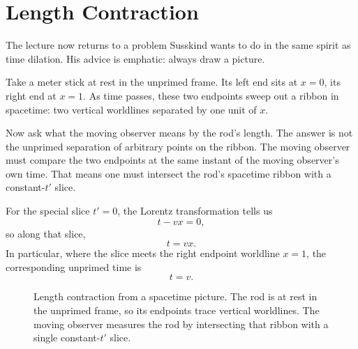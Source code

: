\section{Length Contraction}

The lecture now returns to a problem Susskind wants to do in the same spirit as time dilation. His advice is emphatic: always draw a picture.

Take a meter stick at rest in the unprimed frame. Its left end sits at \(x=0\), its right end at \(x=1\). As time passes, these two endpoints sweep out a ribbon in spacetime: two vertical worldlines separated by one unit of \(x\).

Now ask what the moving observer means by the rod's length. The answer is not the unprimed separation of arbitrary points on the ribbon. The moving observer must compare the two endpoints at the same instant of the moving observer's own time. That means one must intersect the rod's spacetime ribbon with a constant-\(t'\) slice.

For the special slice \(t'=0\), the Lorentz transformation tells us
\begin{equation}
t-vx=0,
\end{equation}
so along that slice,
\begin{equation}
t=vx.
\end{equation}
In particular, where the slice meets the right endpoint worldline \(x=1\), the corresponding unprimed time is
\begin{equation}
t=v.
\end{equation}

\begin{figure}[h]
\centering
{}
\caption{Length contraction from a spacetime picture. The rod is at rest in the unprimed frame, so its endpoints trace vertical worldlines. The moving observer measures the rod by intersecting that ribbon with a single constant-\(t'\) slice.}
\end{figure}

